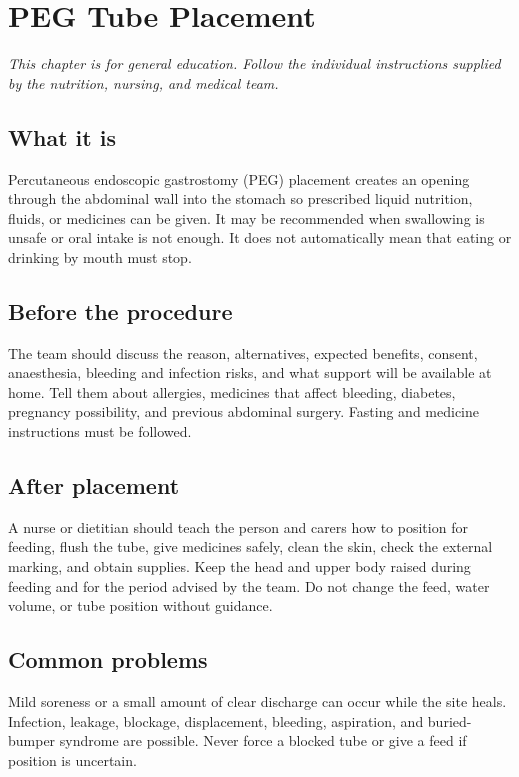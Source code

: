\chapter{PEG Tube Placement}

\medskip
\noindent\textit{This chapter is for general education. Follow the individual instructions supplied by the nutrition, nursing, and medical team.}

\section*{What it is}
Percutaneous endoscopic gastrostomy (PEG) placement creates an opening through the abdominal wall into the stomach so prescribed liquid nutrition, fluids, or medicines can be given. It may be recommended when swallowing is unsafe or oral intake is not enough. It does not automatically mean that eating or drinking by mouth must stop.

\section*{Before the procedure}
The team should discuss the reason, alternatives, expected benefits, consent, anaesthesia, bleeding and infection risks, and what support will be available at home. Tell them about allergies, medicines that affect bleeding, diabetes, pregnancy possibility, and previous abdominal surgery. Fasting and medicine instructions must be followed.

\section*{After placement}
A nurse or dietitian should teach the person and carers how to position for feeding, flush the tube, give medicines safely, clean the skin, check the external marking, and obtain supplies. Keep the head and upper body raised during feeding and for the period advised by the team. Do not change the feed, water volume, or tube position without guidance.

\section*{Common problems}
Mild soreness or a small amount of clear discharge can occur while the site heals. Infection, leakage, blockage, displacement, bleeding, aspiration, and buried-bumper syndrome are possible. Never force a blocked tube or give a feed if position is uncertain.

